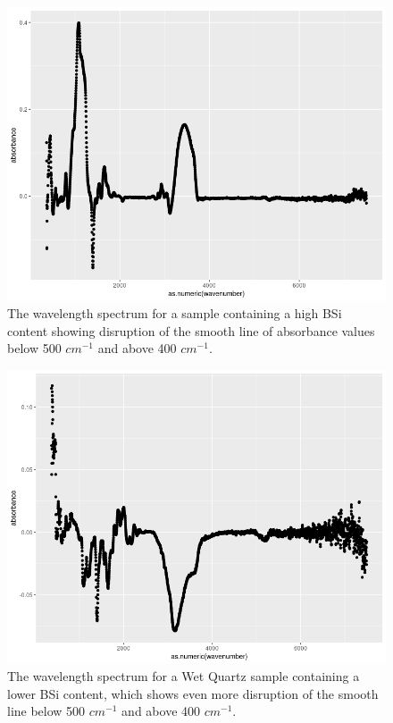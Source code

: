 \documentclass[water,article,submit,moreauthors,pdftex]{mdpi}
\begin{document}
\begin{figure}

{\centering \includegraphics[width=0.8\linewidth]{NANDB-4-highBSI} 

}

\caption{The wavelength spectrum for a sample containing a high BSi content showing disruption of the smooth line of absorbance values below 500 $cm^{-1}$ and above 400 $cm^{-1}$.}\label{fig:fig2}
\end{figure}

\begin{figure}

{\centering \includegraphics[width=0.8\linewidth]{WQ-lowBSi} 

}

\caption{The wavelength spectrum for a Wet Quartz sample containing a lower BSi content, which shows even more disruption of the smooth line below 500 $cm^{-1}$ and above 400 $cm^{-1}$.}\label{fig:fig3}
\end{figure}
\end{document}
